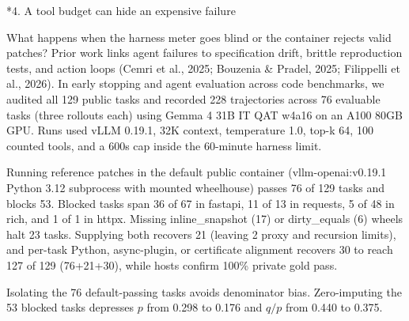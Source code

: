 \documentclass[10pt,a4paper]{article}
\makeatletter
\renewcommand{\section}{\@startsection{section}{1}{\z@}{-1.6ex plus -.2ex minus -.2ex}{.65ex}{\large\bfseries\raggedright}}
\makeatother
\begin{document}
\section*{4. A tool budget can hide an expensive failure}

What happens when the harness meter goes blind or the container rejects valid patches? Prior work links agent failures to specification drift, brittle reproduction tests, and action loops (Cemri et al., 2025; Bouzenia \& Pradel, 2025; Filippelli et al., 2026). In early stopping and agent evaluation across code benchmarks, we audited all 129 public tasks and recorded 228 trajectories across 76 evaluable tasks (three rollouts each) using Gemma 4 31B IT QAT w4a16 on an A100 80GB GPU. Runs used vLLM 0.19.1, 32K context, temperature 1.0, top-k 64, 100 counted tools, and a 600s cap inside the 60-minute harness limit.

Running reference patches in the default public container (vllm-openai:v0.\allowbreak{}19.\allowbreak{}1 Python 3.12 subprocess with mounted wheelhouse) passes 76 of 129 tasks and blocks 53. Blocked tasks span 36 of 67 in fastapi, 11 of 13 in requests, 5 of 48 in rich, and 1 of 1 in httpx. Missing inline\_\allowbreak{}snapshot (17) or dirty\_\allowbreak{}equals (6) wheels halt 23 tasks. Supplying both recovers 21 (leaving 2 proxy and recursion limits), and per-task Python, async-plugin, or certificate alignment recovers 30 to reach 127 of 129 (76+21+30), while hosts confirm 100\% private gold pass.

Isolating the 76 default-passing tasks avoids denominator bias. Zero-imputing the 53 blocked tasks depresses \(p\) from 0.298 to 0.176 and \(q/p\) from 0.440 to 0.375.
\end{document}
